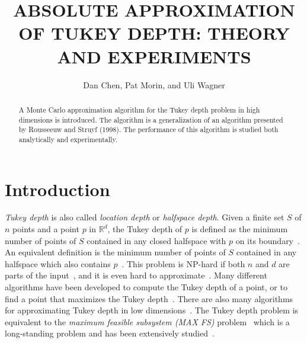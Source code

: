 \documentclass{patmorin}
\title{\MakeUppercase{Absolute Approximation of Tukey Depth: \newline
       Theory and Experiments}}
\author{Dan Chen, Pat Morin, and Uli Wagner}
\begin{document}
\maketitle


\begin{abstract}
  A Monte Carlo approximation algorithm for the Tukey depth problem in high dimensions is introduced. The algorithm is a generalization of an algorithm presented by Rousseeuw and Struyf (1998). The performance of this algorithm is studied both analytically and experimentally.
\end{abstract}


\section{Introduction}
\label{sec:intro}


\emph{Tukey depth} is also called \emph{location depth} or \emph{halfspace depth}. Given a finite set $S$ of $n$ points and a point $p$ in $\mathbb{R}^{d}$, the Tukey depth of $p$ is defined as the minimum number of points of $S$ contained in any closed halfspace with $p$ on its boundary~\cite{Hodges,Tukey}. An equivalent definition is the minimum number of points of $S$ contained in any halfspace which also contains $p$~\cite{Bremner08}. This problem is NP-hard if both $n$ and $d$ are parts of the input~\cite{Johnson}, and it is even hard to approximate~\cite{Amaldi95}. Many different algorithms have been developed to compute the Tukey depth of a point, or to find a point that maximizes the Tukey depth~\cite{Bremner06, Chan04, Langerman03, Matousek92, Rousseeuw98}. There are also many algorithms for approximating Tukey depth in low dimensions~\cite{Afshani07, Cuesta08, Rousseeuw98, Wilcox03}. The Tukey depth problem is equivalent to the \emph{maximum feasible subsystem (MAX FS)} problem~\cite{Chen07} which is a long-standing problem and has been extensively studied~\cite[Chapter 7]{Chinneck08}.
\end{document}
